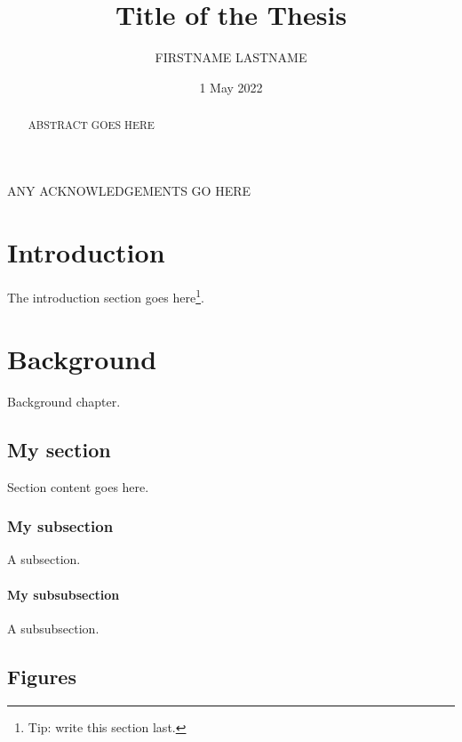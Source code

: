 \documentclass{statsmsc}
\title{Title of the Thesis}
\author{FIRSTNAME LASTNAME}
\date{1 May 2022}
\begin{document}
\maketitle


\declaration 


\begin{abstract}
    ABSTRACT GOES HERE
\end{abstract}

\begin{acknowledgements}
    ANY ACKNOWLEDGEMENTS GO HERE
\end{acknowledgements}


\mainmatter


\chapter{Introduction}

The introduction section goes here\footnote{Tip: write this section last.}.

\chapter{Background}

Background chapter.

\section{My section}

Section content goes here. 

\subsection{My subsection}

A subsection.

\subsubsection{My subsubsection}

A subsubsection.

\section{Figures}
\end{document}
